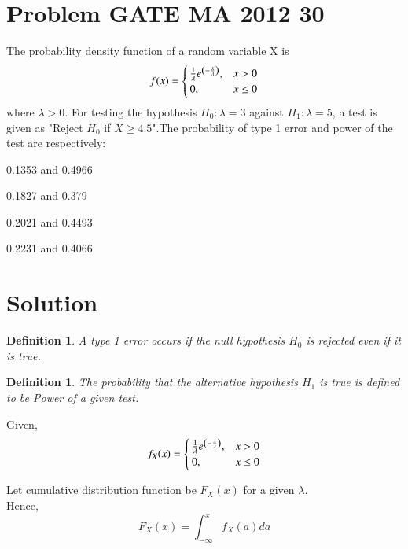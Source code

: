 \documentclass[journal,12pt,twocolumn]{IEEEtran}
\newtheorem{defn}[theorem]{Definition}
\begin{document}
\section{Problem GATE MA 2012 30}
The probability density function of a random variable X is
\begin{equation}
f(x)=
\begin{cases}
\frac{1}{\lambda}e^{\left(-\frac{x}{\lambda}\right)}, & x>0\\
0, & x\leq 0
\end{cases}
\end{equation}
where $\lambda>0.$ For testing the hypothesis $H_{0}:\lambda=3$ against $H_{1}:\lambda=5$, a test is given as "Reject $H_0$ if $X\geq 4.5$".The probability of type 1 error and power of the test are respectively: 
\begin{enumerate}[(A)]
\begin{multicols}{2}
\setlength\itemsep{1em}

\item 0.1353 and 0.4966\\
\item 0.1827 and 0.379\\
\item 0.2021 and 0.4493\\
\item 0.2231 and 0.4066

\end{multicols}
\end{enumerate}
\section{Solution}
\begin{defn}
\label{Type 1 error}A type 1 error occurs if the null hypothesis $H_{0}$ is rejected even if it is true.
\end{defn}
\begin{defn}
\label{Power of the test}The probability that the alternative hypothesis $H_{1}$ is true is defined to be Power of a given test. 
\end{defn}
Given,
\begin{equation}
f_{X}(x)=
\begin{cases}
\frac{1}{\lambda}e^{\left(-\frac{x}{\lambda}\right)}, & x>0\\
0, & x\leq 0
\end{cases}
\end{equation}

Let cumulative distribution function be $F_{X}(x)$ for a given $\lambda$.\\
Hence,
\begin{equation}
    F_{X}(x)=\int_{-\infty}^{x}f_{X}(a) da
\end{equation}
\end{document}
